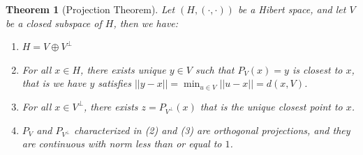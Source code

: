 \documentclass[11pt]{book}
\theoremstyle{break}
\theoremstyle{break}
\newtheorem{thm}{Theorem}[section]
\begin{document}
\begin{thm}[Projection Theorem]
Let $(H, (\cdot , \cdot) )$ be a Hibert space, and let $V$ be a closed subspace of $H$, then we have:
\begin{enumerate}[topsep=3pt,itemsep=-1ex,partopsep=1ex,parsep=1ex]
\item $H = V \oplus V^\perp$
\item For all $x \in H$, there exists unique $y \in V$ such that $P_V(x) = y$ is closest to $x$, that is we have $y$ satisfies $||y - x|| = \min_{u \in V}||u - x|| = d(x,V)$.
\item For all $x\in V^{\perp}$, there exists $z = P_{V^{\perp}}(x)$ that is the unique closest point to $x$. 
\item $P_V$ and $P_{V^{\perp}}$ characterized in (2) and (3) are orthogonal projections, and they are continuous with norm less than or equal to $1$. 
\end{enumerate}
\end{thm}
\end{document}
